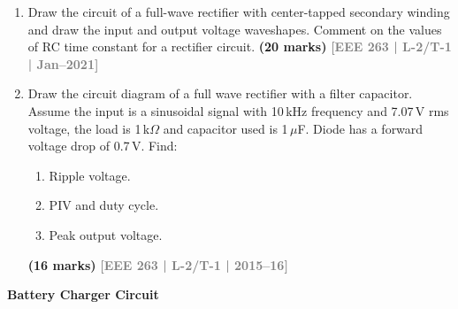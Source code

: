 \documentclass[12pt,a3paper]{article}
\newcommand{\yr}[1]{\hfill\textcolor{gray}{\small\textbf{[#1]}}}
\newcommand{\mk}[1]{\textcolor{orange!70!black}{\small\textbf{(#1 marks)}}}
\newcommand{\subtopic}[2]{%
  \vspace{10pt}
  \noindent\begin{tcolorbox}[colback=#1!8,colframe=#1,boxrule=0.6pt,arc=4pt,
    left=6pt,right=6pt,top=4pt,bottom=4pt]
    \small\bfseries\textcolor{#1}{#2}
  \end{tcolorbox}
  \vspace{2pt}
}
\begin{document}
\begin{enumerate}
    
    \item Draw the circuit of a full-wave rectifier with center-tapped secondary winding and draw the input and output voltage waveshapes. Comment on the values of RC time constant for a rectifier circuit.
\mk{20} \yr{EEE 263 | L-2/T-1 | Jan--2021}  
    
    \item Draw the circuit diagram of a full wave rectifier with a filter capacitor. Assume the input is a sinusoidal signal with 10\,kHz frequency and 7.07\,V rms voltage, the load is 1\,k$\Omega$ and capacitor used is 1\,$\mu$F. Diode has a forward voltage drop of 0.7\,V. Find:
\begin{enumerate}\item Ripple voltage.
  \item PIV and duty cycle.
  \item Peak output voltage.
\end{enumerate}
\mk{16} \yr{EEE 263 | L-2/T-1 | 2015--16}


\end{enumerate}

\subtopic{cA}{Battery Charger Circuit}
\label{sub:s1-battery}
\end{document}
